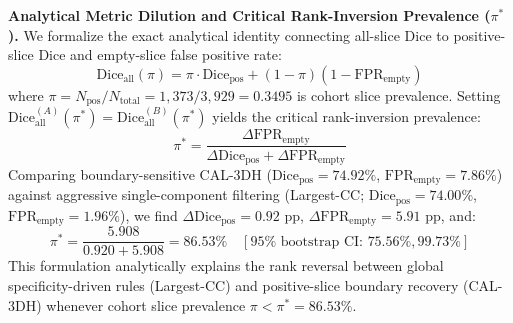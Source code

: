 \documentclass[11pt,a4paper]{article}
\begin{document}
\noindent\textbf{Analytical Metric Dilution and Critical Rank-Inversion Prevalence ($\pi^*$).}
We formalize the exact analytical identity connecting all-slice Dice to positive-slice Dice and empty-slice false positive rate:
\begin{equation}
\label{eq:metric_dilution_identity}
\text{Dice}_{\text{all}}(\pi) = \pi \cdot \text{Dice}_{\text{pos}} + (1 - \pi)(1 - \text{FPR}_{\text{empty}})
\end{equation}
where $\pi = N_{\text{pos}} / N_{\text{total}} = 1,373 / 3,929 = 0.3495$ is cohort slice prevalence. Setting $\text{Dice}_{\text{all}}^{(A)}(\pi^*) = \text{Dice}_{\text{all}}^{(B)}(\pi^*)$ yields the critical rank-inversion prevalence:
\begin{equation}
\label{eq:pi_star}
\pi^* = \frac{\Delta\text{FPR}_{\text{empty}}}{\Delta\text{Dice}_{\text{pos}} + \Delta\text{FPR}_{\text{empty}}}
\end{equation}
Comparing boundary-sensitive CAL-3DH ($\text{Dice}_{\text{pos}} = 74.92\%$, $\text{FPR}_{\text{empty}} = 7.86\%$) against aggressive single-component filtering (Largest-CC; $\text{Dice}_{\text{pos}} = 74.00\%$, $\text{FPR}_{\text{empty}} = 1.96\%$), we find $\Delta\text{Dice}_{\text{pos}} = 0.92\text{ pp}$, $\Delta\text{FPR}_{\text{empty}} = 5.91\text{ pp}$, and:
\begin{equation}
\pi^* = \frac{5.908}{0.920 + 5.908} = 86.53\% \quad [95\%\text{ bootstrap CI: } 75.56\%, 99.73\%]
\end{equation}
This formulation analytically explains the rank reversal between global specificity-driven rules (Largest-CC) and positive-slice boundary recovery (CAL-3DH) whenever cohort slice prevalence $\pi < \pi^* = 86.53\%$.
\end{document}
